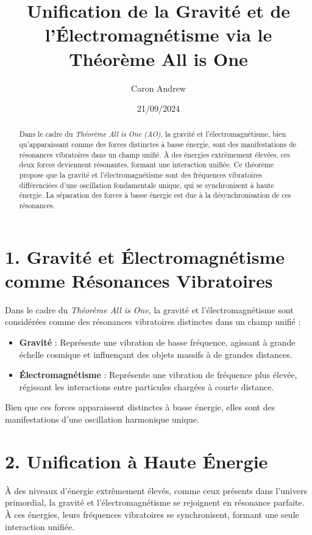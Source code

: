 \documentclass{article}
\title{Unification de la Gravité et de l'Électromagnétisme via le Théorème All is One}
\author{Caron Andrew}
\date{21/09/2024}
\begin{document}
\maketitle

\begin{abstract}
Dans le cadre du \textit{Théorème All is One (AO)}, la gravité et l'électromagnétisme, bien qu'apparaissant comme des forces distinctes à basse énergie, sont des manifestations de résonances vibratoires dans un champ unifié. À des énergies extrêmement élevées, ces deux forces deviennent résonantes, formant une interaction unifiée. Ce théorème propose que la gravité et l'électromagnétisme sont des fréquences vibratoires différenciées d'une oscillation fondamentale unique, qui se synchronisent à haute énergie. La séparation des forces à basse énergie est due à la désynchronisation de ces résonances.
\end{abstract}

\section{1. Gravité et Électromagnétisme comme Résonances Vibratoires}

Dans le cadre du \textit{Théorème All is One}, la gravité et l'électromagnétisme sont considérées comme des résonances vibratoires distinctes dans un champ unifié :
\begin{itemize}
    \item \textbf{Gravité} : Représente une vibration de basse fréquence, agissant à grande échelle cosmique et influençant des objets massifs à de grandes distances.
    \item \textbf{Électromagnétisme} : Représente une vibration de fréquence plus élevée, régissant les interactions entre particules chargées à courte distance.
\end{itemize}

Bien que ces forces apparaissent distinctes à basse énergie, elles sont des manifestations d'une oscillation harmonique unique.

\section{2. Unification à Haute Énergie}

À des niveaux d'énergie extrêmement élevés, comme ceux présents dans l'univers primordial, la gravité et l'électromagnétisme se rejoignent en résonance parfaite. À ces énergies, leurs fréquences vibratoires se synchronisent, formant une seule interaction unifiée.
\end{document}
